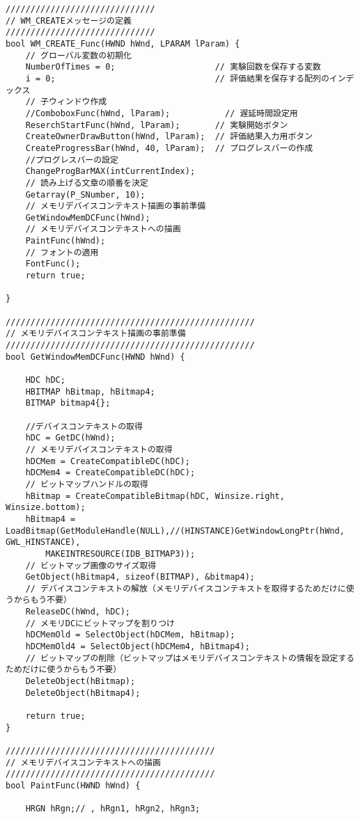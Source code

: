 \begin{lstlisting}[caption=main.cpp]
//////////////////////////////
// WM_CREATEメッセージの定義
//////////////////////////////
bool WM_CREATE_Func(HWND hWnd, LPARAM lParam) {
	// グローバル変数の初期化
	NumberOfTimes = 0;                    // 実験回数を保存する変数
	i = 0;                                // 評価結果を保存する配列のインデックス
	// 子ウィンドウ作成
	//ComboboxFunc(hWnd, lParam);           // 遅延時間設定用
	ReserchStartFunc(hWnd, lParam);       // 実験開始ボタン
	CreateOwnerDrawButton(hWnd, lParam);  // 評価結果入力用ボタン
	CreateProgressBar(hWnd, 40, lParam);  // プログレスバーの作成
	//プログレスバーの設定
	ChangeProgBarMAX(intCurrentIndex);
	// 読み上げる文章の順番を決定									  
	Getarray(P_SNumber, 10);
	// メモリデバイスコンテキスト描画の事前準備
	GetWindowMemDCFunc(hWnd);
	// メモリデバイスコンテキストへの描画
	PaintFunc(hWnd);
	// フォントの適用
	FontFunc();                        
	return true;

}

//////////////////////////////////////////////////
// メモリデバイスコンテキスト描画の事前準備
//////////////////////////////////////////////////
bool GetWindowMemDCFunc(HWND hWnd) {

	HDC hDC;
	HBITMAP hBitmap, hBitmap4;
	BITMAP bitmap4{};
	
	//デバイスコンテキストの取得
	hDC = GetDC(hWnd);
	// メモリデバイスコンテキストの取得
	hDCMem = CreateCompatibleDC(hDC);
	hDCMem4 = CreateCompatibleDC(hDC);
	// ビットマップハンドルの取得
	hBitmap = CreateCompatibleBitmap(hDC, Winsize.right, Winsize.bottom);
	hBitmap4 = LoadBitmap(GetModuleHandle(NULL),//(HINSTANCE)GetWindowLongPtr(hWnd, GWL_HINSTANCE),
		MAKEINTRESOURCE(IDB_BITMAP3));
	// ビットマップ画像のサイズ取得
	GetObject(hBitmap4, sizeof(BITMAP), &bitmap4);
	// デバイスコンテキストの解放（メモリデバイスコンテキストを取得するためだけに使うからもう不要）
	ReleaseDC(hWnd, hDC);
	// メモリDCにビットマップを割りつけ
	hDCMemOld = SelectObject(hDCMem, hBitmap);
	hDCMemOld4 = SelectObject(hDCMem4, hBitmap4);
	// ビットマップの削除（ビットマップはメモリデバイスコンテキストの情報を設定するためだけに使うからもう不要）
	DeleteObject(hBitmap);
	DeleteObject(hBitmap4);

	return true;
}

//////////////////////////////////////////
// メモリデバイスコンテキストへの描画
//////////////////////////////////////////
bool PaintFunc(HWND hWnd) {

	HRGN hRgn;// , hRgn1, hRgn2, hRgn3;


\end{lstlisting}
